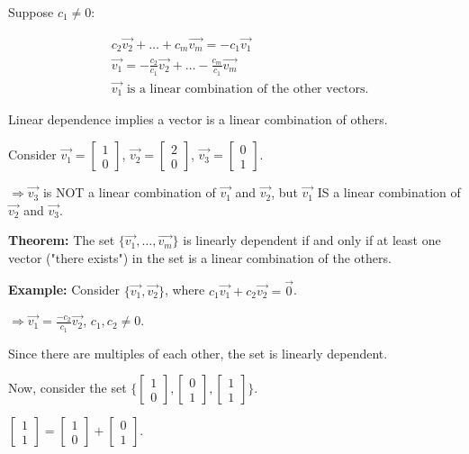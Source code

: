 \documentclass{article}
\begin{document}
Suppose \(c_1 \neq 0\):

\[
\begin{aligned}
    &c_2\vec{v_2} + \ldots + c_m\vec{v_m} = -c_1\vec{v_1} \\
    &\vec{v_1} = -\frac{c_2}{c_1}\vec{v_2} + \ldots -\frac{c_m}{c_1}\vec{v_m} \\
    &\vec{v_1} \text{ is a linear combination of the other vectors.}
\end{aligned}
\]

Linear dependence implies a vector is a linear combination of others.

Consider \(\vec{v_1} = \begin{bmatrix} 1 \\ 0 \end{bmatrix}\), \(\vec{v_2} = \begin{bmatrix} 2 \\ 0 \end{bmatrix}\), \(\vec{v_3} = \begin{bmatrix} 0 \\ 1 \end{bmatrix}\).


\(\Rightarrow \vec{v_3}\) is NOT a linear combination of \(\vec{v_1}\) and \(\vec{v_2}\), but \(\vec{v_1}\) IS a linear combination of \(\vec{v_2}\) and \(\vec{v_3}\).


\textbf{Theorem:} The set \(\{\vec{v_1}, \ldots , \vec{v_m}\}\) is linearly dependent if and only if at least one vector ("there exists") in the set is a linear combination of the others.

\textbf{Example:} Consider \(\{\vec{v_1}, \vec{v_2}\}\), where \(c_1\vec{v_1} + c_2\vec{v_2} = \vec{0}\).

\(\Rightarrow \vec{v_1} = \frac{-c_2}{c_1}\vec{v_2}\), \(c_1, c_2 \neq 0\).

Since there are multiples of each other, the set is linearly dependent.

Now, consider the set \(\{\begin{bmatrix} 1 \\ 0 \end{bmatrix}, \begin{bmatrix} 0 \\ 1 \end{bmatrix}, \begin{bmatrix} 1 \\ 1 \end{bmatrix}\}\).

\(\begin{bmatrix} 1 \\ 1 \end{bmatrix} = \begin{bmatrix} 1 \\ 0 \end{bmatrix} + \begin{bmatrix} 0 \\ 1 \end{bmatrix}\).
\end{document}
